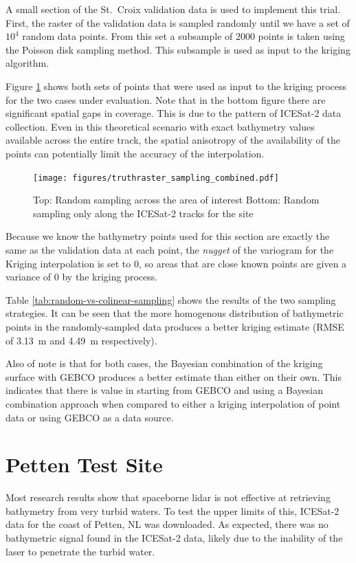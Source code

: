 A small section of the St.~Croix validation data is used to implement this trial. First, the raster of the validation data is sampled randomly until we have a set of $10^4$ random data points. From this set a subsample of $2000$ points is taken using the Poisson disk sampling method. This subsample is used as input to the kriging algorithm.

Figure \ref{fig:truthras-sampling} shows both sets of points that were used as input to the kriging process for the two cases under evaluation. Note that in the bottom figure  there are significant spatial gaps in coverage. This is due to the pattern of ICESat-2 data collection. Even in this theoretical scenario with exact bathymetry values available across the entire track, the spatial anisotropy of the availability of the points can potentially limit the accuracy of the interpolation.

\begin{figure}[h]
    \centering
    \texttt{[image: figures/truthraster\_sampling\_combined.pdf]}
    \caption[Random sampling points for validation test]{Top: Random sampling across the area of interest \newline   Bottom: Random sampling only along the ICESat-2 tracks for the site}
    \label{fig:truthras-sampling}
\end{figure}

Because we know the bathymetry points used for this section are exactly the same as the validation data at each point, the \emph{nugget} of the variogram for the Kriging interpolation is set to $0$, so areas that are close known points are given a variance of $0$ by the kriging process.


Table \ref{tab:random-vs-colinear-sampling} shows the results of the two sampling strategies. It can be seen that the more homogenous distribution of bathymetric points in the randomly-sampled data produces a better kriging estimate (RMSE of 3.13~m and 4.49~m respectively).

Also of note is that for both cases, the Bayesian combination of the kriging surface with GEBCO produces a better estimate than either on their own. This indicates that there is value in starting from GEBCO and using a Bayesian combination approach when compared to either a kriging interpolation of point data or using GEBCO as a data source.


\section{Petten Test Site}
Most research results show that spaceborne lidar is not effective at retrieving bathymetry from very turbid waters. To test the upper limits of this, ICESat-2 data for the coast of Petten, NL was downloaded. As expected, there was no bathymetric signal found in the ICESat-2 data, likely due to the inability of the laser to penetrate the turbid water.

